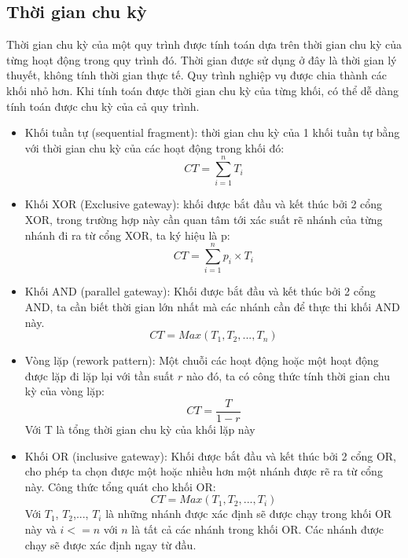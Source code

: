 \subsection{Thời gian chu kỳ}
Thời gian chu kỳ của một quy trình được tính toán dựa trên thời gian chu kỳ của từng hoạt động trong quy trình đó. Thời gian được sử dụng ở đây là thời gian lý thuyết, không tính thời gian thực tế.
Quy trình nghiệp vụ được chia thành các khối nhỏ hơn. Khi tính toán được thời gian chu kỳ của từng khối, có thể dễ dàng tính toán được chu kỳ của cả quy trình.
\begin{itemize}
    \item Khối tuần tự (sequential fragment): thời gian chu kỳ của 1 khối tuần tự bằng với thời gian chu kỳ của các hoạt động trong khối đó:
 \[ CT =\sum_{i=1}^{n} T_i \]
   \item Khối XOR (Exclusive gateway): khối được bắt đầu và kết thúc bởi 2 cổng XOR, trong trường hợp này cần quan tâm tới xác suất rẽ nhánh của từng nhánh đi ra từ cổng XOR, ta ký hiệu là p:
   \[ CT =\sum_{i=1}^{n} p_i \times T_i \]
   \item Khối AND (parallel gateway): Khối được bắt đầu và kết thúc bởi 2 cổng AND, ta cần biết thời gian lớn nhất mà các nhánh cần để thực thi khối AND này.
   \[ CT = Max(T_1, T_2,..., T_n) \]
   \item Vòng lặp (rework pattern): Một chuỗi các hoạt động hoặc một hoạt động được lặp đi lặp lại với tần suất $r$ nào đó, ta có công thức tính thời gian chu kỳ của vòng lặp:
   \[ CT = \frac{T}{1 - r}\]
   Với T là tổng thời gian chu kỳ của khối lặp này
   \item Khối OR (inclusive gateway): Khối được bắt đầu và kết thúc bởi 2 cổng OR, cho phép ta chọn được một hoặc nhiều hơn một nhánh được rẽ ra từ cổng này. Công thức tổng quát cho khối OR:
   \[ CT = Max(T_1, T_2,..., T_i)\]
   Với $T_1$, $T_2$,..., $T_i$ là những nhánh được xác định sẽ được chạy trong khối OR này và $i <= n$ với $n$ là tất cả các nhánh trong khối OR. Các nhánh được chạy sẽ được xác định ngay từ đầu.
\end{itemize}